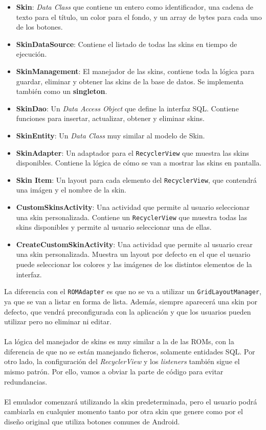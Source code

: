 \begin{itemize}
    \item \textbf{Skin}: \textit{Data Class} que contiene un entero como identificador, una cadena de texto para el título, un color para el fondo, y un array de bytes para cada uno de los botones.
    \item \textbf{SkinDataSource}: Contiene el listado de todas las skins en tiempo de ejecución.
    \item \textbf{SkinManagement}: El manejador de las skins, contiene toda la lógica para guardar, eliminar y obtener las skins de la base de datos. Se implementa también como un \textbf{singleton}.
    \item \textbf{SkinDao}: Un \textit{Data Access Object} que define la interfaz SQL. Contiene funciones para insertar, actualizar, obtener y eliminar skins.
    \item \textbf{SkinEntity}: Un \textit{Data Class} muy similar al modelo de Skin.
    \item \textbf{SkinAdapter}: Un adaptador para el \texttt{RecyclerView} que muestra las skins disponibles. Contiene la lógica de cómo se van a mostrar las skins en pantalla.
    \item \textbf{Skin Item}: Un layout para cada elemento del \texttt{RecyclerView}, que contendrá una imágen y el nombre de la skin.
    \item \textbf{CustomSkinsActivity}: Una actividad que permite al usuario seleccionar una skin personalizada. Contiene un \texttt{RecyclerView} que muestra todas las skins disponibles y permite al usuario seleccionar una de ellas.
    \item \textbf{CreateCustomSkinActivity}: Una actividad que permite al usuario crear una skin personalizada. Muestra un layout por defecto en el que el usuario puede seleccionar los colores y las imágenes de los distintos elementos de la interfaz.
\end{itemize}

La diferencia con el \texttt{ROMAdapter} es que no se va a utilizar un \texttt{GridLayoutManager}, ya que se van a listar en forma de lista. Además, siempre aparecerá una skin por defecto, que vendrá preconfigurada con la aplicación y que los usuarios pueden utilizar pero no eliminar ni editar.
\\\\
La lógica del manejador de skins es muy similar a la de las ROMs, con la diferencia de que no se están manejando ficheros, solamente entidades SQL. Por otro lado, la configuración del \textit{RecyclerView} y los \textit{listeners} también sigue el mismo patrón. Por ello, vamos a obviar la parte de código para evitar redundancias.
\\\\
El emulador comenzará utilizando la skin predeterminada, pero el usuario podrá cambiarla en cualquier momento tanto por otra skin que genere como por el diseño original que utiliza botones comunes de Android.

